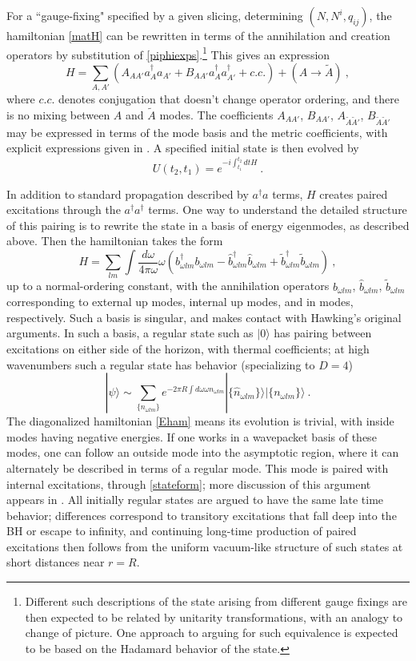 \documentclass[11pt]{article}
\numberwithin{equation}{section}
\newcommand{\beq}{\begin{equation}}
\newcommand{\eeq}{\end{equation}}
\newcommand{\tA}{{\tilde A}}
\begin{document}
For a ``gauge-fixing" specified by a  given slicing, determining $(N, N^i, q_{ij})$, the hamiltonian \eqref{matH} can be rewritten in terms of the annihilation and creation operators by substitution of \eqref{piphiexps}.\footnote{Different such descriptions of the state arising from different gauge fixings are then expected to be related by unitarity transformations, with an analogy to change of picture.  One approach to arguing for such equivalence is expected to be based on the Hadamard behavior of the state\cite{KaWa}.} This gives an expression
\beq\label{Hama}
H = \sum_{A,A'} \left(A_{AA'} a^\dagger_A a_{A'} + B_{AA'} a^\dagger_A a^\dagger_{A'} + c.c. \right) + (A\rightarrow \tilde A)\ ,
\eeq
where $c.c.$ denotes conjugation that doesn't change operator ordering, and there is no mixing between $A$ and $\tilde A$ modes.  The coefficients $A_{AA'}$, $B_{AA'}$, $A_{\tA\tA'}$, $B_{\tA\tA'}$ may be expressed in terms of the mode basis and the metric coefficients, with explicit expressions given in \cite{SEHS,SE2d}\cite{GiPe1}.  
A specified initial state is then evolved by
\beq\label{Uev}
U(t_2,t_1)= e^{-i\int_{t_1}^{t_2} dt H}\ .
\eeq

In addition to standard propagation described by $a^\dagger a$ terms, $H$ creates paired excitations through the $a^\dagger a^\dagger$ terms.  One way to understand the detailed structure of this pairing is to rewrite the state in a basis of energy eigenmodes, as described above.  
Then the hamiltonian takes the form\cite{GiPe1}
\beq\label{Eham}
H= \sum_{lm} \int \frac{d\omega}{4 \pi \omega} \omega (b_{\omega lm}^{\dagger}b_{\omega lm} - \hat b_{\omega lm}^{\dagger} \hat b_{\omega lm} + \tilde b_{\omega lm}^{\dagger}\tilde b_{\omega lm}  )  \ ,
\eeq 
up to a normal-ordering constant, with the annihilation operators $b_{\omega lm}$, $\hat b_{\omega lm}$, $\tilde b_{\omega lm}$ corresponding to external up modes, internal up modes, and in modes, respectively.
Such a basis is singular, and makes contact with Hawking's original arguments\cite{Hawk}.  In such a basis, a regular state such as $|0\rangle$ has pairing between excitations on either side of the horizon, with thermal coefficients; at high wavenumbers such a regular state has behavior (specializing to $D=4$)
\beq\label{stateform}
|\psi\rangle \sim\sum_{\{n_{\omega lm}\}} e^{-2\pi R\int d\omega \omega n_{\omega lm} }| \{\hat n_{\omega lm}\} \rangle |\{n_{\omega lm}\}\rangle\ .
\eeq
The diagonalized hamiltonian \eqref{Eham} means its evolution is trivial, with inside modes having negative energies.  If one works in a wavepacket basis of these modes, one can follow an outside mode into the asymptotic region, where it can alternately be described in terms of a regular mode.  This mode is paired with internal excitations, through \eqref{stateform}; more discussion of this argument appears in \cite{GiPe1}.  All initially regular states are argued to have the same late time behavior; differences correspond to transitory excitations that fall deep into the BH or escape to infinity, and continuing long-time production of paired excitations then follows from the uniform vacuum-like structure of such states at short distances near $r=R$.
\end{document}

